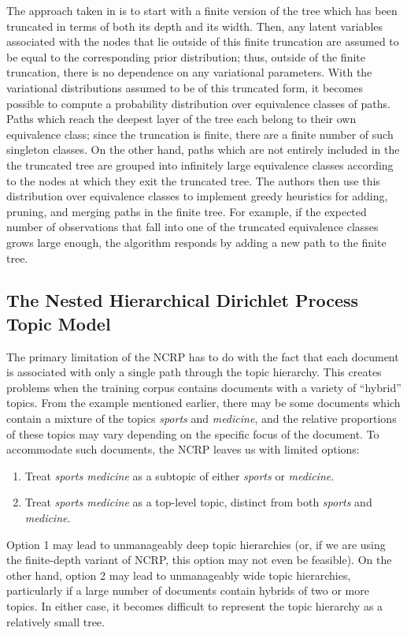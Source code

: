 \documentclass{article}
\begin{document}
The approach taken in \cite{wang2009vi_ncrp} is to start with a finite version of the tree which has been truncated in terms of both its depth and its width.
Then, any latent variables associated with the nodes that lie outside of this finite truncation are assumed to be equal to the corresponding prior distribution; thus, outside of the finite truncation, there is no dependence on any variational parameters.
With the variational distributions assumed to be of this truncated form, it becomes possible to compute a probability distribution over equivalence classes of paths.
Paths which reach the deepest layer of the tree each belong to their own equivalence class; since the truncation is finite, there are a finite number of such singleton classes.
On the other hand, paths which are not entirely included in the the truncated tree are grouped into infinitely large equivalence classes according to the nodes at which they exit the truncated tree.
The authors then use this distribution over equivalence classes to implement greedy heuristics for adding, pruning, and merging paths in the finite tree.
For example, if the expected number of observations that fall into one of the truncated equivalence classes grows large enough, the algorithm responds by adding a new path to the finite tree.

\subsection{The Nested Hierarchical Dirichlet Process Topic Model}

The primary limitation of the NCRP has to do with the fact that each document is associated with only a single path through the topic hierarchy.
This creates problems when the training corpus contains documents with a variety of ``hybrid'' topics.
From the example mentioned earlier, there may be some documents which contain a mixture of the topics \emph{sports} and \emph{medicine}, and the relative proportions of these topics may vary depending on the specific focus of the document.
To accommodate such documents, the NCRP leaves us with limited options:
\begin{enumerate}
\item Treat \emph{sports medicine} as a subtopic of either \emph{sports} or \emph{medicine}.
\item Treat \emph{sports medicine} as a top-level topic, distinct from both \emph{sports} and \emph{medicine}.
\end{enumerate}
Option 1 may lead to unmanageably deep topic hierarchies (or, if we are using the finite-depth variant of NCRP, this option may not even be feasible).
On the other hand, option 2 may lead to unmanageably wide topic hierarchies, particularly if a large number of documents contain hybrids of two or more topics.
In either case, it becomes difficult to represent the topic hierarchy as a relatively small tree.
\end{document}
